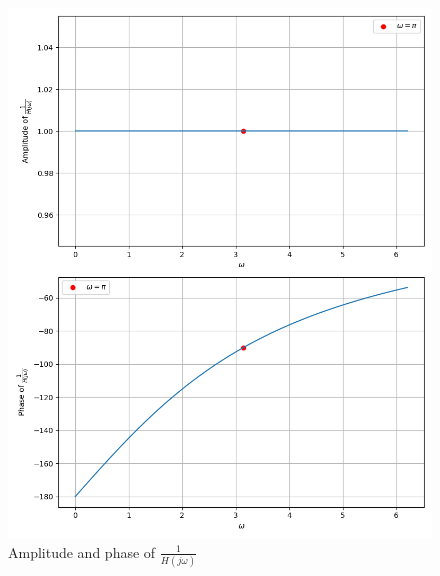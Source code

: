 \documentclass[journal,12pt,twocolumn]{IEEEtran}
\theoremstyle{remark}
\begin{document}
\begin{figure}[h]
  \centering
  \includegraphics[width=\columnwidth]{2023/IN/21/figs/fig1.png} 
  \captionsetup{justification=centering}
  \caption{Amplitude and phase of $\frac{1}{H(j\omega)}$}
  \label{fig:in.21.f4}
\end{figure}





\end{document}
